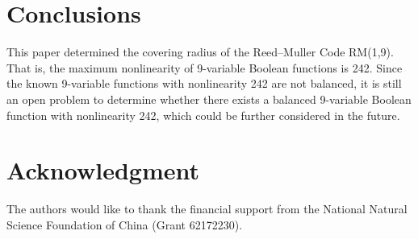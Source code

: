 \documentclass[11pt]{article}
\newtheorem{open problem}{Open problem}
\begin{document}
\section{Conclusions}
This paper determined the covering radius of the Reed--Muller Code RM(1,9).
That is, the maximum nonlinearity of 9-variable Boolean functions is 242. Since the known 9-variable functions with nonlinearity 242 are not balanced, it is still an open problem to determine whether there exists a balanced 9-variable Boolean function with nonlinearity 242, which could be further considered in the future.


\section*{Acknowledgment}

The authors would like to thank the financial support from the National Natural Science Foundation of China (Grant 62172230).
\end{document}
